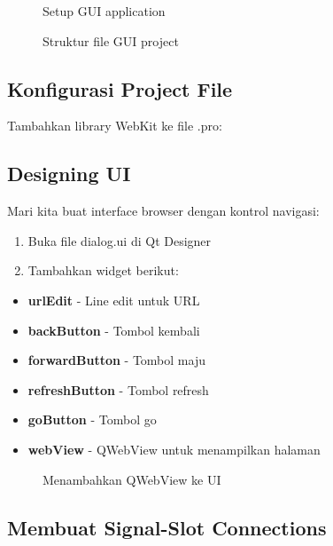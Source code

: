 \begin{figure}[htbp]
\centering
{}
\caption{Setup GUI application}
\end{figure}

\begin{figure}[htbp]
\centering
{}
\caption{Struktur file GUI project}
\end{figure}

\subsection{Konfigurasi Project File}

Tambahkan library WebKit ke file .pro:



\subsection{Designing UI}

Mari kita buat interface browser dengan kontrol navigasi:

\begin{enumerate}
\item Buka file dialog.ui di Qt Designer
\item Tambahkan widget berikut:
\end{enumerate}

\begin{itemize}
\item \textbf{urlEdit} - Line edit untuk URL
\item \textbf{backButton} - Tombol kembali
\item \textbf{forwardButton} - Tombol maju
\item \textbf{refreshButton} - Tombol refresh
\item \textbf{goButton} - Tombol go
\item \textbf{webView} - QWebView untuk menampilkan halaman
\end{itemize}

\begin{figure}[htbp]
\centering
{}
\caption{Menambahkan QWebView ke UI}
\end{figure}

\subsection{Membuat Signal-Slot Connections}

